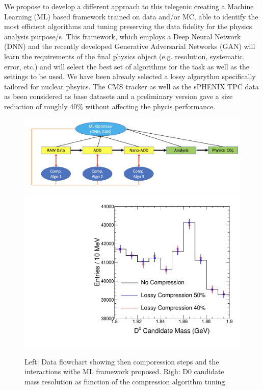 We propose to develop a different approach to this telegenic creating a Machine Learning (ML) based framework trained on data and/or MC, able to identify the most efficient algorithms and tuning preserving the data fidelity for the physics analysis purpose/s. This framework, which employs a Deep Neural Network (DNN) and the recently developed Generative Adversarial Networks (GAN) will learn the requirements of the final physics object (e.g. resolution, systematic error, etc.) and will select the best set of algorithms for the task as well as the settings to be used. We have been already selected a lossy algorythm specifically tailored for nuclear phsyics. The CMS tracker as well as the sPHENIX TPC data as been considered as base datasets and a preliminary version gave a size reduction of roughly 40\% without affecting the phycis performance. 

\begin{figure}[!ht]
    \vspace{-0.4cm}
    \begin{center}
    \includegraphics[width=.71\textwidth]{HI_Compress/figure/CompSchema.png}
    \hspace{0.0\textwidth}
    \includegraphics[width=.27\textwidth]{HI_Compress/figure/aleph/Performance.pdf}
    \vspace{-0.5cm}
    \caption{Left: Data flowchart showing then comporession steps and the interactions withe ML framework proposed. Righ: D0 candidate mass resolution as function of the compression algorithm tuning}
    \label{fig:concept}
    \end{center}
\end{figure}

